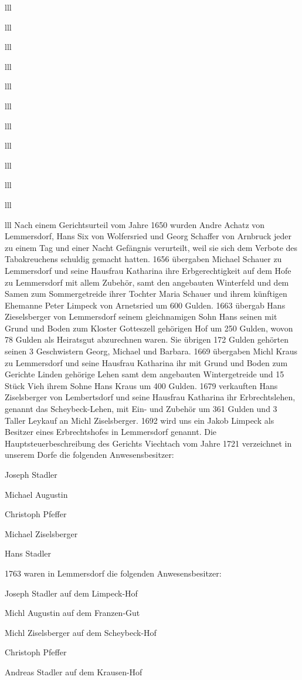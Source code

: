 \documentclass[12pt,a4pager]{book}
\begin{document}
\begin{tabuluar}{lll}
\begin{tabuluar}{lll}
\begin{tabuluar}{lll}
\begin{tabuluar}{lll}
\begin{tabuluar}{lll}
\begin{tabuluar}{lll}
\begin{tabuluar}{lll}
\begin{tabuluar}{lll}
\begin{tabuluar}{lll}
\begin{tabuluar}{lll}
\begin{tabuluar}{lll}
\begin{tabuluar}{lll}
Nach einem Gerichtsurteil vom Jahre 1650 wurden Andre Achatz von Lemmersdorf,
Hans Six von Wolfersried und Georg Schaffer von Arnbruck jeder zu einem Tag und
einer Nacht Gefängnis verurteilt, weil sie sich dem Verbote des Tabakreuchens
schuldig gemacht hatten. 1656 übergaben Michael Schauer zu Lemmersdorf und seine
Hausfrau Katharina ihre Erbgerechtigkeit auf dem Hofe zu Lemmersdorf mit allem
Zubehör, samt den angebauten Winterfeld und dem Samen zum Sommergetreide ihrer
Tochter Maria Schauer und ihrem künftigen Ehemanne Peter Limpeck von Arnetsried
um 600 Gulden. 1663 übergab Hans Zieselsberger von Lemmersdorf seinem
gleichnamigen Sohn Hans seinen mit Grund und Boden zum Kloster Gotteszell
gehörigen Hof um 250 Gulden, wovon 78 Gulden als Heiratsgut abzurechnen waren.
Sie übrigen 172 Gulden gehörten seinen 3 Geschwistern Georg, Michael und
Barbara. 1669 übergaben Michl Kraus zu Lemmersdorf und seine Hausfrau Katharina
ihr mit Grund und Boden zum Gerichte Linden gehörige Lehen samt dem angebauten
Wintergetreide und 15 Stück Vieh ihrem Sohne Hans Kraus um 400 Gulden. 1679
verkauften Hans Ziselsberger von Lembertsdorf und seine Hausfrau Katharina ihr
Erbrechtslehen, genannt das Scheybeck-Lehen, mit Ein- und Zubehör um 361 Gulden
und 3 Taller Leykauf an Michl Ziselsberger. 1692 wird uns ein Jakob Limpeck als
Besitzer eines Erbrechtshofes in Lemmersdorf genannt. Die
Hauptsteuerbeschreibung des Gerichts Viechtach vom Jahre 1721 verzeichnet in
unserem Dorfe die folgenden Anwesensbesitzer:

\begin{compactitem}
\item Joseph Stadler
\item Michael Augustin
\item Christoph Pfeffer
\item Michael Ziselsberger
\item Hans Stadler
\end{compactitem}

1763 waren in Lemmersdorf die folgenden Anwesensbesitzer:

\begin{compactitem}
\item Joseph Stadler auf dem Limpeck-Hof
\item Michl Augustin auf dem Franzen-Gut
\item Michl Ziselsberger auf dem Scheybeck-Hof
\item Christoph Pfeffer
\item Andreas Stadler auf dem Krausen-Hof
\end{compactitem}


\end{tabuluar}
\end{tabuluar}
\end{tabuluar}
\end{tabuluar}
\end{tabuluar}
\end{tabuluar}
\end{tabuluar}
\end{tabuluar}
\end{tabuluar}
\end{tabuluar}
\end{tabuluar}
\end{tabuluar}
\end{document}

